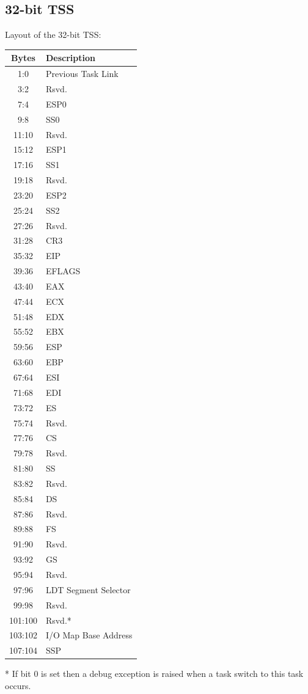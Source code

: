 \documentclass{article}
\newcommand{\layout}[1]{\parbox{\linewidth}{#1}}
\begin{document}
\layout{
  \subsection{32-bit TSS}

  Layout of the 32-bit TSS:
  \begin{table}[H]
    \centering
    \begin{tabular}{|c|l|}
      \hline \textbf{Bytes} & \textbf{Description} \\ \hline
      1:0 & Previous Task Link \\
      3:2 & Rsvd. \\
      7:4 & ESP0 \\
      9:8 & SS0 \\
      11:10 & Rsvd. \\
      15:12 & ESP1 \\
      17:16 & SS1 \\
      19:18 & Rsvd. \\
      23:20 & ESP2 \\
      25:24 & SS2 \\
      27:26 & Rsvd. \\
      31:28 & CR3 \\
      35:32 & EIP \\
      39:36 & EFLAGS \\
      43:40 & EAX \\
      47:44 & ECX \\
      51:48 & EDX \\
      55:52 & EBX \\
      59:56 & ESP \\
      63:60 & EBP \\
      67:64 & ESI \\
      71:68 & EDI \\
      73:72 & ES \\
      75:74 & Rsvd. \\
      77:76 & CS \\
      79:78 & Rsvd. \\
      81:80 & SS \\
      83:82 & Rsvd. \\
      85:84 & DS \\
      87:86 & Rsvd. \\
      89:88 & FS \\
      91:90 & Rsvd. \\
      93:92 & GS \\
      95:94 & Rsvd. \\
      97:96 & LDT Segment Selector \\
      99:98 & Rsvd. \\
      101:100 & Rsvd.* \\
      103:102 & I/O Map Base Address \\
      107:104 & SSP \\ \hline
    \end{tabular}
  \end{table}

  * If bit 0 is set then a debug exception is raised when a task switch to this task occurs.
} \bigskip
\end{document}
